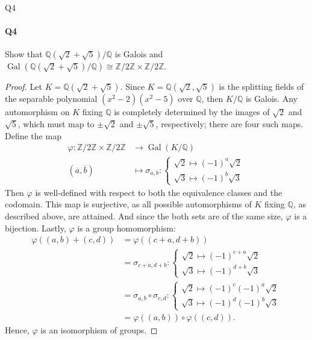 \documentclass[12pt]{article}
\newenvironment{fullbox}{\begin{lrbox}{\savefullbox}\begin{minipage}{\dimexpr\textwidth-2\fboxsep\relax}}{\end{minipage}\end{lrbox}\begin{center}\framebox[\textwidth]{\usebox{\savefullbox}}\end{center}}
\newenvironment{pbox}[1][]{\begin{fullbox}\ifx#1\empty\else\paragraph{#1}\fi}{\end{fullbox}}
\newcommand{\Z}{\mathbb{Z}}
\newcommand{\Q}{\mathbb{Q}}
\renewcommand{\phi}{\varphi}
\newcommand{\<}{\langle}
\renewcommand{\>}{\rangle}
\newcommand{\isom}{\cong}
\newcommand{\eqc}{\overline}
\DeclareMathOperator{\Gal}{Gal}
\begin{document}
\newpage
\begin{pbox}[Q4]
    Show that $\Q(\sqrt{2} + \sqrt{5})/\Q$ is Galois and $\Gal(\Q(\sqrt{2} + \sqrt{5})/\Q) \isom \Z/2\Z \times \Z/2\Z$.
\end{pbox}

\begin{proof}
    Let $K = \Q(\sqrt{2} + \sqrt{5})$. Since $K = \Q(\sqrt{2}, \sqrt{5})$ is the splitting fields of the separable polynomial $(x^2 - 2)(x^2 - 5)$ over $\Q$, then $K/\Q$ is Galois. Any automorphism on $K$ fixing $\Q$ is completely determined by the images of $\sqrt{2}$ and $\sqrt{5}$, which must map to $\pm\sqrt{2}$ and $\pm\sqrt{5}$, respectively; there are four such maps. Define the map
    \begin{align*}
        \phi :  \Z/2\Z \times \Z/2\Z &\to \Gal(K/\Q) \\
            (\eqc{a}, \eqc{b}) &\mapsto \sigma_{a, b} : 
                \begin{cases}
                    \sqrt{2} \mapsto (-1)^a\sqrt{2} \\
                    \sqrt{3} \mapsto (-1)^b\sqrt{3}
                \end{cases}
    \end{align*}
    Then $\phi$ is well-defined with respect to both the equivalence classes and the codomain. This map is surjective, as all possible automorphisms of $K$ fixing $\Q$, as described above, are attained. And since the both sets are of the same size, $\phi$ is a bijection. Lastly, $\phi$ is a group homomorphism:
    \begin{align*}
        \phi((a, b) + (c, d)) 
            &= \phi((c + a, d + b)) \\
            &= \sigma_{c + a, d + b} :
                \begin{cases}
                    \sqrt{2} \mapsto (-1)^{c + a}\sqrt{2} \\
                    \sqrt{3} \mapsto (-1)^{d + b}\sqrt{3}
                \end{cases} \\
            &= \sigma_{a, b} \circ \sigma_{c, d} :
                \begin{cases}
                    \sqrt{2} \mapsto (-1)^c(-1)^a\sqrt{2} \\
                    \sqrt{3} \mapsto (-1)^d(-1)^b\sqrt{3}
                \end{cases} \\
            &= \phi((a, b)) \circ \phi((c, d)).
    \end{align*}
    Hence, $\phi$ is an isomorphism of groups.

\end{proof}
\end{document}
